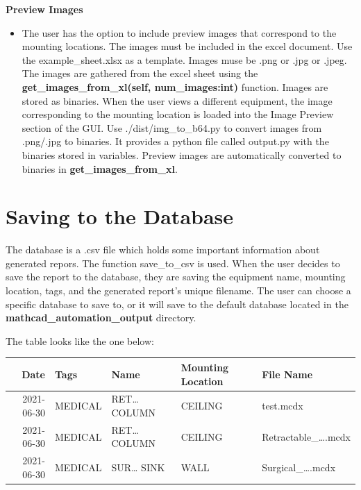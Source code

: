 \documentclass[11pt]{article}
\begin{document}
\textbf{Preview Images}
\begin{itemize}
\item The user has the option to include preview images that correspond to the mounting locations. The images must be included in the excel document. Use the example\_sheet.xlsx as a template. Images muse be .png or .jpg or .jpeg. The images are gathered from the excel sheet using the \textbf{get\_images\_from\_xl(self, num\_images:int)} function. Images are stored as binaries. When the user views a different equipment, the image corresponding to the mounting location is loaded into the Image Preview section of the GUI. Use ./dist/img\_to\_b64.py to convert images from .png/.jpg to binaries. It provides a python file called output.py with the binaries stored in variables. Preview images are automatically converted to binaries in \textbf{get\_images\_from\_xl}.
\end{itemize}

\section{Saving to the Database}
\label{sec:org16f41f6}
The database is a .csv file which holds some important information about generated repors. The function save\_to\_csv is used. When the user decides to save the report to the database, they are saving the equipment name, mounting location, tags, and the generated report's unique filename. The user can choose a specific database to save to, or it will save to the default database located in the \textbf{mathcad\_automation\_output} directory.

The table looks like the one below:
\begin{center}
\begin{tabular}{rllll}
\hline
Date & Tags & Name & Mounting Location & File Name\\
\hline
2021-06-30 & MEDICAL & RET\ldots{} COLUMN & CEILING & test.mcdx\\
2021-06-30 & MEDICAL & RET\ldots{} COLUMN & CEILING & Retractable\_\ldots{}.mcdx\\
2021-06-30 & MEDICAL & SUR\ldots{} SINK & WALL & Surgical\_\ldots{}.mcdx\\
\hline
\end{tabular}
\end{center}
\end{document}
